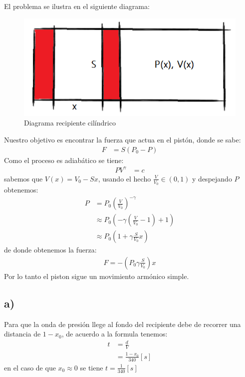 \documentclass{article}
\begin{document}
\begin{tcolorbox}[breakable]
    El problema se ilustra en el siguiente diagrama:
    \begin{figure}[H]
        \centering
        \includegraphics[scale=0.5]{images/p5_piston.png}
        \caption{Diagrama recipiente cilíndrico}
    \end{figure}
    Nuestro objetivo es encontrar la fuerza que actua en el pistón, donde se 
    sabe:
    \begin{align*}
        F &= S(P_0-P)
    \end{align*}
    Como el proceso es adiabático se tiene:
    \begin{align*}
        PV^{\gamma} &= c
    \end{align*}
    sabemos que $V(x) = V_0-Sx$, usando el hecho $\frac{V}{V_0} \in (0,1)$ y
    despejando $P$ obtenemos:
    \begin{align*}
        P &= P_0 \left( \frac{V}{V_0} \right)^{-\gamma} \\ 
        &\approx P_0 \left(-\gamma \left(\frac{V}{V_0}-1\right) + 1\right)  \\
        &\approx P_0 \left(1+\gamma \frac{S}{V_0}x \right)
    \end{align*}
    de donde obtenemos la fuerza:
    \begin{align*}
        F = -\left(P_0\gamma \frac{S}{V_0}\right)x 
    \end{align*}
    Por lo tanto el piston sigue un movimiento armónico simple. 
    \subsection*{a)}
    Para que la onda de presión llege al fondo del recipiente debe de recorrer una 
    distancia de $1-x_0$, de acuerdo a la formula tenemos:
    \begin{align*}
        t 
        &= \frac{d}{V} \\
        &= \frac{1-x_0}{340}[s]
    \end{align*}
    en el caso de que $x_0 \approx 0$ se tiene $t = \frac{1}{340}[s]$

\end{tcolorbox}
\end{document}
